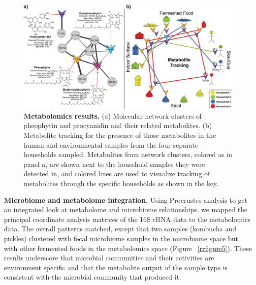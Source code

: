 \begin{figure}[htbp]
\includegraphics[width=\columnwidth]{chapter_48_hours_figures/F4.jpg}
\caption[Metabolomics results]{\textbf{Metabolomics results.} (a) Molecular network clusters of pheophytin and procyanidin and their related metabolites. (b) Metabolite tracking for the presence of those metabolites in the human and environmental samples from the four separate households sampled. Metabolites from network clusters, colored as in panel a, are shown next to the household samples they were detected in, and colored lines are used to visualize tracking of metabolites through the specific households as shown in the key.}
\label{rrfigure4}
\end{figure}

\textbf{Microbiome and metabolome integration.} Using Procrustes analysis \cite{Vazquez-Baeza2013}
to get an integrated look at metabolome and microbiome relationships, we mapped the
principal coordinate analysis matrices of the 16S rRNA data to the metabolomics
data. The overall patterns matched, except that two samples (kombucha and pickles)
clustered with fecal microbiome samples in the microbiome space but with other
fermented foods in the metabolomics space (Figure ~\ref{rrfigure5}). These
results underscore that microbial communities and their activities are environment
specific and that the metabolite output of the sample type is consistent with the
microbial community that produced it.


